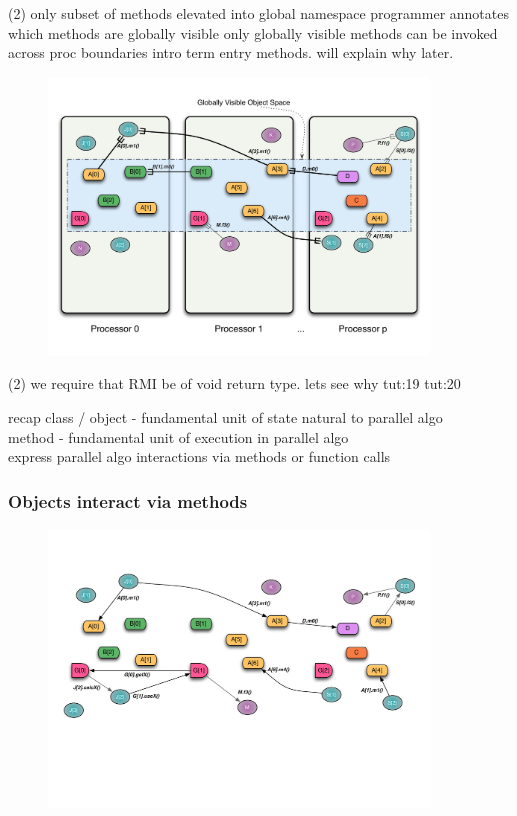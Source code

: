\begin{frame}
(2) only subset of methods elevated into global namespace
programmer annotates which methods are globally visible
only globally visible methods can be invoked across proc boundaries
intro term entry methods. will explain why later.
  \begin{figure}\includegraphics[width=0.9\textwidth]{../figures/progmodel/11-global-methods.pdf}\end{figure}
\end{frame}


\begin{frame}
(2) we require that RMI be of void return type. lets see why
tut:19
tut:20
\end{frame}


\begin{frame}
recap
    class / object - fundamental unit of state natural to parallel algo\\
    method - fundamental unit of execution in parallel algo\\
    express parallel algo interactions via methods or function calls
\end{frame}


\begin{frame}
  \frametitle{Objects interact via methods}
  \begin{figure}
    \includegraphics[width=0.9\textwidth]{../figures/progmodel/07-algo-via-objects-methods.pdf}
  \end{figure}
\end{frame}


